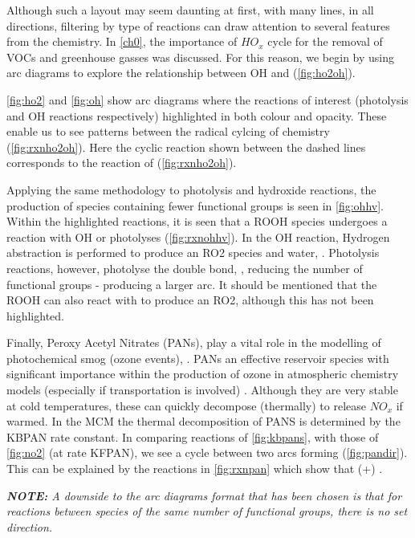 Although such a layout may seem daunting at first, with many lines, in all directions, filtering by type of reactions can draw attention to several features from the chemistry. In \autoref{ch0}, the importance of $HO_x$ cycle for the removal of VOCs and greenhouse gasses was discussed. For this reason, we begin by using arc diagrams to explore the relationship between OH and  (\autoref{fig:ho2oh}).

\autoref{fig:ho2} and \autoref{fig:oh} show arc diagrams where the reactions of interest (photolysis and OH reactions respectively) highlighted in both colour and opacity. These enable us to see patterns between the radical cylcing of  chemistry (\autoref{fig:rxnho2oh}). Here the cyclic reaction shown between the dashed lines corresponds to the reaction of  (\autoref{fig:rxnho2oh}).

Applying the same methodology to photolysis and hydroxide reactions, the production of species containing fewer functional groups is seen in \autoref{fig:ohhv}. Within the highlighted reactions, it is seen that a ROOH species undergoes a reaction with OH or photolyses (\autoref{fig:rxnohhv}). In the OH reaction, Hydrogen abstraction is performed to produce an RO2 species and water, . Photolysis reactions, however, photolyse the double bond, , reducing the number of functional groups - producing a larger arc. It should be mentioned that the ROOH can also react with  to produce an RO2, although this has not been highlighted.

Finally, Peroxy Acetyl Nitrates (PANs), play a vital role in the modelling of photochemical smog (ozone events), \citep{pans}. PANs an effective reservoir species with significant importance within the production of ozone in atmospheric chemistry models (especially if transportation is involved) \citep{finlayson}. Although they are very stable at cold temperatures, these can quickly decompose (thermally) to release $NO_x$ if warmed. In the MCM the thermal decomposition of PANS is determined by the KBPAN rate constant. In comparing reactions of \autoref{fig:kbpans}, with those of \autoref{fig:no2} (at rate KFPAN), we see a cycle between two arcs forming (\autoref{fig:pandir}). This can be explained by the reactions in \autoref{fig:rxnpan} which show that  (+) .

\textit{\textbf{NOTE:} A downside to the arc diagrams format that has been chosen is that for reactions between species of the same number of functional groups, there is no set direction. }



